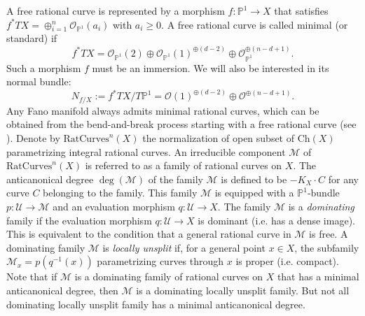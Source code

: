 \documentclass[12pt]{amsart}
\newtheorem{thm}{Theorem}[section]
\theoremstyle{definition}
\newcommand{\IP}{{\mathbb P}}
\newcommand{\CM}{{\mathcal M}}
\newcommand{\CO}{{\mathcal O}}
\newcommand{\CU}{{\mathcal U}}
\begin{document}
A free rational curve is represented by a morphism $f: \IP^1\rightarrow X$ that satisfies $f^*TX=\oplus_{i=1}^n \CO_{\IP^1}(a_i)$ with $a_i\ge 0$. A free rational curve is called minimal (or standard) if
$$
f^*TX=\CO_{\IP^1}(2)\oplus \CO_{\IP^1}(1)^{\oplus(d-2)}\oplus \CO_{\IP^1}^{\oplus (n-d+1)}. 
$$
Such a morphism $f$ must be an immersion. 
We will also be interested in its normal bundle:
$$
N_{f/X}:=f^*TX/T\IP^1=\CO(1)^{\oplus (d-2)}\oplus \CO^{\oplus (n-d+1)}.
$$
Any Fano manifold always admits minimal rational curves, which can be obtained from the bend-and-break process starting with a free rational curve (see \cite[IV.Theorem 2.10]{Kol96}). Denote by $\mathrm{RatCurves}^n(X)$ the normalization of open subset of $\mathrm{Ch}(X)$ parametrizing integral rational curves. 
An irreducible component $\CM$ of $\mathrm{RatCurves}^n(X)$ is referred to as a family of rational curves on $X$. 
The anticanonical degree $\deg(\CM)$ of the family $\CM$ is defined to be $-K_X\cdot C$ for any curve $C$ belonging to the family. This family $\CM$ is equipped with a $\IP^1$-bundle $p: \CU\rightarrow \CM$ and an evaluation morphism $q: \CU\rightarrow X$.  
The family $\CM$ is a \textit{dominating} family if the evaluation morphism $q: \CU\rightarrow X$ is dominant (i.e. has a dense image). This is equivalent to the condition that a general rational curve in $\CM$ is free. 
A dominating family $\CM$ is \textit{locally unsplit} if, for a general point $x\in X$, the subfamily $\CM_x=p(q^{-1}(x))$ parametrizing curves through $x$ is proper (i.e. compact). Note that if $\CM$ is a dominating family of rational curves on $X$ that has a minimal anticanonical degree, then $\CM$ is a dominating locally unsplit family. But not all dominating locally unsplit family has a minimal anticanonical degree.
\end{document}
